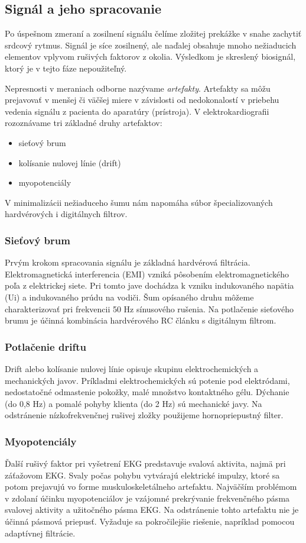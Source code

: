 \documentclass[titlepage,12pt]{article}
\begin{document}
\subsection{Signál a jeho spracovanie}
Po úspešnom zmeraní a zosilnení signálu čelíme zložitej prekážke v snahe zachytiť srdcový rytmus. Signál je síce zosilnený, ale naďalej obsahuje mnoho nežiaducich elementov vplyvom rušivých faktorov z okolia. Výsledkom je skreslený biosignál, ktorý je v tejto fáze nepoužiteľný.

Nepresnosti v meraniach odborne nazývame \emph{artefakty}. Artefakty sa môžu prejavovať v menšej či väčšej miere v závislosti od nedokonalostí v priebehu vedenia signálu z pacienta do aparatúry (prístroja). V elektrokardiografii rozoznávame tri základné druhy artefaktov:
\begin{itemize}
	\item sieťový brum
	\item kolísanie nulovej línie (drift)
	\item myopotenciály
\end{itemize}

V minimalizácii nežiaduceho šumu nám napomáha súbor špecializovaných hardvérových i digitálnych filtrov.

\subsubsection{Sieťový brum}
Prvým krokom spracovania signálu je základná hardvérová filtrácia. Elektromagnetická interferencia (EMI) vzniká pôsobením  elektromagnetického poľa z elektrickej siete. Pri tomto jave dochádza k vzniku indukovaného napätia (Ui) a indukovaného prúdu na vodiči. Šum opísaného druhu môžeme charakterizovať pri frekvencii 50 Hz sínusového rušenia. Na potlačenie sieťového brumu je účinná kombinácia hardvérového RC článku s digitálnym filtrom. 

\subsubsection{Potlačenie driftu}
Drift alebo kolísanie nulovej línie opisuje skupinu elektrochemických a mechanických javov. Príkladmi elektrochemických sú potenie pod elektródami, nedostatočné odmastenie pokožky, malé množstvo kontaktného gélu. Dýchanie (do 0,8 Hz) a pomalé pohyby klienta (do 2 Hz) sú mechanické javy. Na odstránenie nízkofrekvenčnej rušivej zložky použijeme hornopriepustný filter.

\subsubsection{Myopotenciály}
Ďalší rušivý faktor pri vyšetrení EKG predstavuje svalová aktivita, najmä pri záťažovom EKG. Svaly počas pohybu vytvárajú elektrické impulzy, ktoré sa potom prejavujú vo forme muskuloskeletálneho artefaktu. Najväčším problémom v zdolaní účinku myopotenciálov je vzájomné prekrývanie frekvenčného pásma svalovej aktivity a užitočného pásma EKG. Na odstránenie tohto artefaktu nie je účinná pásmová priepusť. Vyžaduje sa pokročilejšie riešenie, napríklad pomocou adaptívnej filtrácie. 
\end{document}
